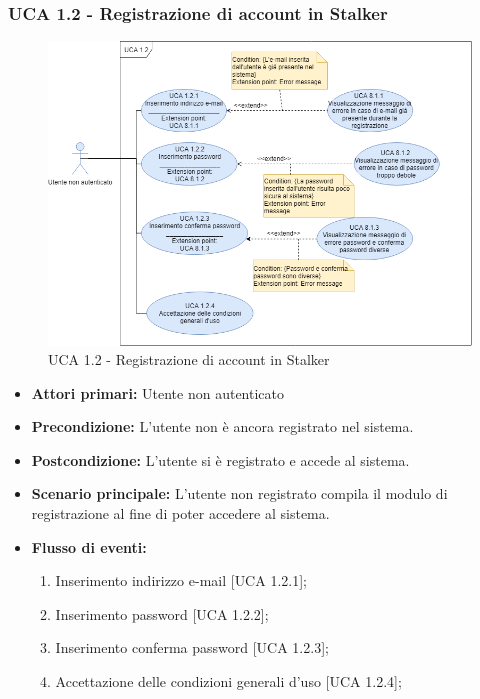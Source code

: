\subsubsection{UCA 1.2 - Registrazione di account in Stalker}%

\begin{figure}[h]
  \centering
    \includegraphics[scale=0.4, center]{sezioni/UseCase/Immagini/UCA1.2.png}
  \caption{UCA 1.2 -  Registrazione di account in Stalker}
\end{figure}

\begin{itemize}
\item \textbf{Attori primari:} Utente non autenticato
\item \textbf{Precondizione:} L'utente non è ancora registrato nel sistema.
\item \textbf{Postcondizione:} L'utente si è registrato e accede al sistema.
\item \textbf{Scenario principale:} L'utente non registrato compila il modulo di registrazione al fine di poter accedere al sistema.
\item \textbf{Flusso di eventi:}
  \begin{enumerate}
        \item Inserimento indirizzo e-mail [UCA 1.2.1];
        \item Inserimento password [UCA 1.2.2];
        \item Inserimento conferma password [UCA 1.2.3];
        \item Accettazione delle condizioni generali d'uso [UCA 1.2.4];
    \end{enumerate}
\end{itemize}


